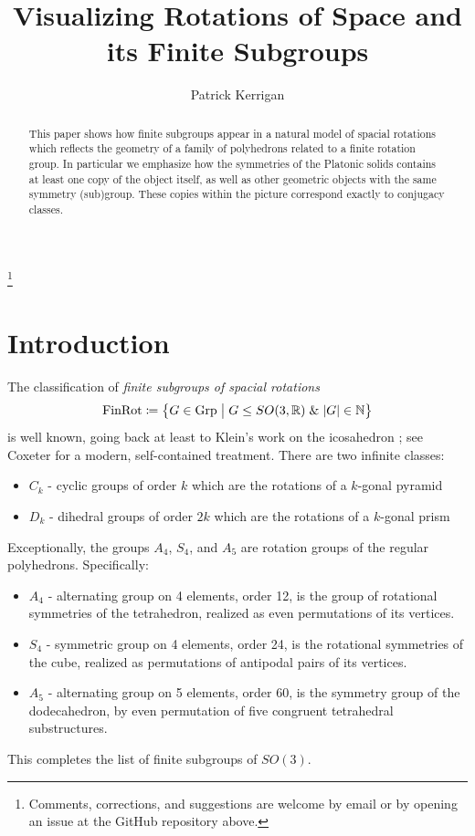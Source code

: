 \documentclass{amsart}
\theoremstyle{plain}
\theoremstyle{definition}
\begin{document}
\title{Visualizing Rotations of Space and its Finite Subgroups}
\author{Patrick Kerrigan}
\address{Independent Researcher}
\thanks{Comments, corrections, and suggestions are welcome by email or by opening an issue at the GitHub repository above.}

\maketitle

\begin{abstract}
This paper shows how finite subgroups appear in a natural model of spacial rotations which reflects the geometry of a family of polyhedrons related to a finite rotation group. In particular we emphasize how the symmetries of the Platonic solids contains at least one copy of the object itself, as well as other geometric objects with the same symmetry (sub)group. These copies within the picture correspond exactly to conjugacy classes.
\end{abstract}


\section{Introduction}
    
    The classification of \emph{finite subgroups of spacial rotations}
    \begin{equation}
        \mathrm{FinRot}\coloneqq\left\{G\in \mathrm{Grp}\hspace{1mm}\big|\hspace{1mm} G\leq SO(3,\mathbb{R})\hspace{1mm}\mathrm{\&}\hspace{1mm} |G|\in \mathbb{N}\right\}
    \end{equation}
    is well known, going back at least to Klein's work on the icosahedron \cite{klein}; see Coxeter \cite[p.~53]{coxeter1973} for a modern, self-contained treatment. There are two infinite classes:
    \begin{itemize}
        \item $C_k$ - cyclic groups of order $k$ which are the rotations of a $k$-gonal pyramid
        \item $D_{k}$ - dihedral groups of order $2k$ which are the rotations of a $k$-gonal prism
    \end{itemize}
    Exceptionally, the groups $A_4$, $S_4$, and $A_5$ are rotation groups of the regular polyhedrons. Specifically:
    \begin{itemize}
        \item $A_4$ - alternating group on 4 elements, order 12, is the group of rotational symmetries of the tetrahedron, realized as even permutations of its vertices.
        \item $S_4$ - symmetric group on 4 elements, order 24, is the rotational symmetries of the cube, realized as permutations of antipodal pairs of its vertices.
        \item $A_5$ - alternating group on 5 elements, order 60, is the symmetry group of the dodecahedron, by even permutation of five congruent tetrahedral substructures.
    \end{itemize}  This completes the list of finite subgroups of $SO(3)$.
    
\end{document}

